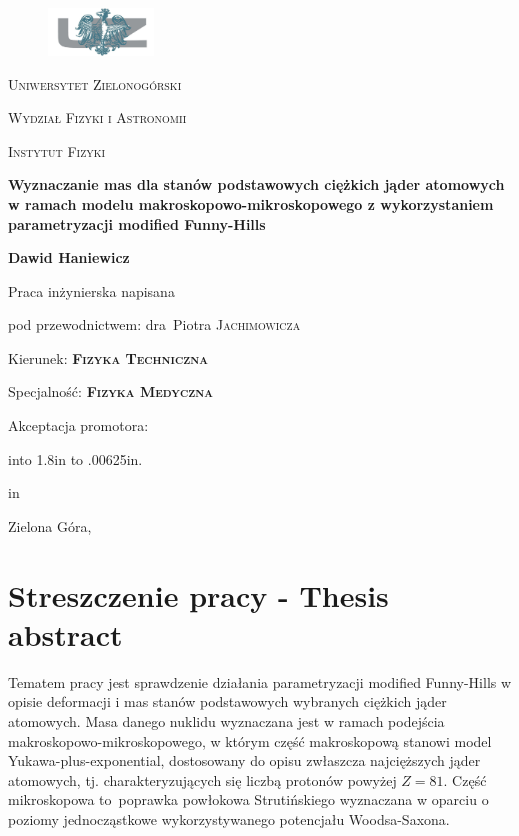 \documentclass[a4paper,polish]{article}
\def\signature#1#2#3{{\hskip#1in{\hbox to #2in%
{\leaders\hbox to .00625in{\hfil.\hfil}\hfill}}%
 \par\hskip#1in#3\vskip1cm}}
\numberwithin{equation}{section}
\begin{document}
\begin{titlepage}
	\renewcommand{\baselinestretch}{1} 
	\centering
	\begin{figure}[t]
	\centering
	\includegraphics[width=0.25\textwidth]{logo_uz}
	\end{figure}
	\vspace{1cm}
	{\scshape\huge Uniwersytet Zielonogórski \par}
	{\scshape\LARGE Wydział Fizyki i Astronomii \par}
	{\scshape\Large Instytut Fizyki \par}
	\vspace{1.5cm}
	{\Large\bfseries Wyznaczanie mas dla stanów podstawowych ciężkich jąder atomowych w ramach modelu makroskopowo-mikroskopowego z wykorzystaniem parametryzacji modif{}ied Funny-Hills \par}
	\vspace{1cm}
	{\Large\textbf{Dawid Haniewicz} \par}
	\vspace{2cm}
	Praca inżynierska napisana \par
	pod przewodnictwem: dra~Piotra \textsc{Jachimowicza} \par
	\vspace{1.5cm}
	{Kierunek: \textsc{\textbf{Fizyka Techniczna}} \par}
	{Specjalność: \textsc{\textbf{Fizyka Medyczna}} \par}
	\vspace{1.5cm}
	Akceptacja promotora: \par
	\vspace{0.5cm}
	\signature{0}{1.8}
	\vfill
	{\large Zielona Góra, \the\year \par}
	\thispagestyle{empty}
\end{titlepage}

\setcounter{page}{2}

\clearpage
\tableofcontents
\clearpage

\section{Streszczenie pracy - Thesis abstract}

Tematem pracy jest sprawdzenie działania parametryzacji modified Funny-Hills w opisie deformacji i mas stanów podstawowych wybranych ciężkich jąder atomowych. Masa danego nuklidu wyznaczana jest w ramach podejścia makroskopowo-mikroskopowego, w którym część makroskopową stanowi model Yukawa-plus-exponential, dostosowany do opisu zwłaszcza najcięższych jąder atomowych, tj. charakteryzujących się liczbą protonów powyżej $Z=81$. Część mikroskopowa to~poprawka powłokowa Strutińskiego wyznaczana w oparciu o poziomy jednocząstkowe wykorzystywanego potencjału Woodsa-Saxona.
\end{document}
